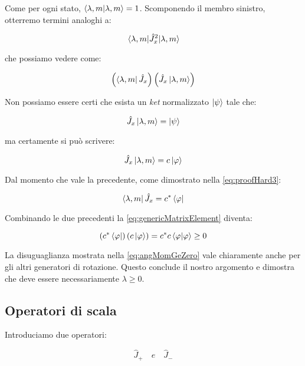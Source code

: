 Come per ogni stato, $\braket{\lambda, m}{\lambda, m} = 1$. Scomponendo il membro sinistro, otterremo termini analoghi a:

	\begin{equation} 
		\mel{\lambda, m}{\hat{J}_x^2}{\lambda, m}
	\end{equation}

che possiamo vedere come:

	\begin{equation} \label{eq:genericMatrixElement}
		\left ( \bra{\lambda, m} \hat{J}_x \right ) \left ( \hat{J}_x \ket{\lambda, m} \right )
	\end{equation}

Non possiamo essere certi che esista un \textit{ket} normalizzato $\ket{\psi}$ tale che:

	\begin{equation}
		\hat{J}_x \ket{\lambda, m} = \ket{\psi}
	\end{equation}

ma certamente si pu\`o scrivere:

	\begin{equation}
		\hat{J}_x \ket{\lambda, m} = c \ket{\varphi}
	\end{equation}

Dal momento che vale la precedente, come dimostrato nella \eqref{eq:proofHard3}:

	\begin{equation}
		\bra{\lambda, m} \hat{J}_x = c^* \bra{\varphi}
	\end{equation}

Combinando le due precedenti la \eqref{eq:genericMatrixElement} diventa:

	\begin{equation} \label{eq:angMomGeZero}
		\left ( c^* \bra{\varphi} \right ) \left ( c \ket{\varphi} \right ) = c^*c \braket{\varphi}{\varphi} \ge 0
	\end{equation}

La disuguaglianza mostrata nella \eqref{eq:angMomGeZero} vale chiaramente anche per gli altri generatori di rotazione. Questo conclude il nostro argomento e dimostra che deve essere necessariamente $\lambda \ge 0$.

\subsection{Operatori di scala}

Introduciamo due operatori:

	\[
		\hat{J}_+ \quad e \quad \hat{J}_-
	\]


